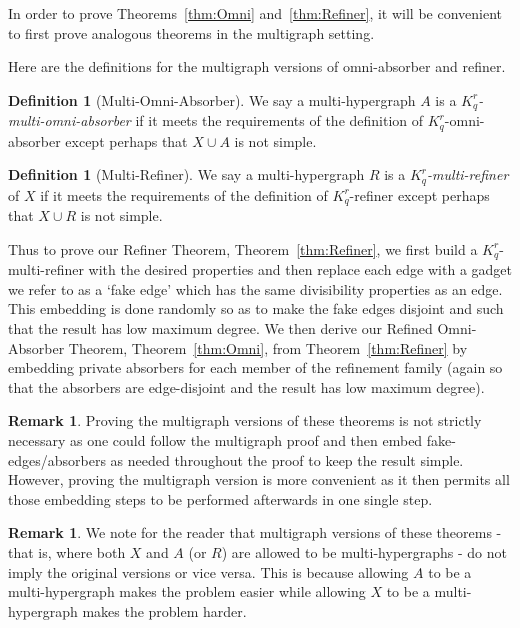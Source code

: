 \documentclass[11pt]{article}
\newcounter{i}
\theoremstyle{plain}
\theoremstyle{plain} %
\theoremstyle{definition}
\newtheorem{definition}[thm]{Definition}
\newtheorem{remark}[thm]{Remark}
\begin{document}
In order to prove Theorems~\ref{thm:Omni} and~\ref{thm:Refiner}, it will be convenient to first prove analogous theorems in the multigraph setting. 

Here are the definitions for the multigraph versions of omni-absorber and refiner.

\begin{definition}[Multi-Omni-Absorber]
We say a multi-hypergraph $A$ is a \emph{$K_q^r$-multi-omni-absorber} if it meets the requirements of the definition of $K_q^r$-omni-absorber except perhaps that $X\cup A$ is not simple.
\end{definition}

\begin{definition}[Multi-Refiner]
We say a multi-hypergraph $R$ is a \emph{$K_q^r$-multi-refiner} of $X$ if it meets the requirements of the definition of $K_q^r$-refiner except perhaps that $X\cup R$ is not simple.
\end{definition}

Thus to prove our Refiner Theorem, Theorem~\ref{thm:Refiner}, we first build a $K_q^r$-multi-refiner with the desired properties and then replace each edge with a gadget we refer to as a `fake edge' which has the same divisibility properties as an edge. This embedding is done randomly so as to make the fake edges disjoint and such that the result has low maximum degree. We then derive our Refined Omni-Absorber Theorem, Theorem~\ref{thm:Omni}, from Theorem~\ref{thm:Refiner} by embedding private absorbers for each member of the refinement family (again so that the absorbers are edge-disjoint and the result has low maximum degree).

\begin{remark}
Proving the multigraph versions of these theorems is not strictly necessary as one could follow the multigraph proof and then embed fake-edges/absorbers as needed throughout the proof to keep the result simple. However, proving the multigraph version is more convenient as it then permits all those embedding steps to be performed afterwards in one single step.    
\end{remark}

\begin{remark}
We note for the reader that multigraph versions of these theorems - that is, where both $X$ and $A$ (or $R$) are allowed to be multi-hypergraphs - do not imply the original versions or vice versa. This is because allowing $A$ to be a multi-hypergraph makes the problem easier while allowing $X$ to be a multi-hypergraph makes the problem harder.
\end{remark}
\end{document}
